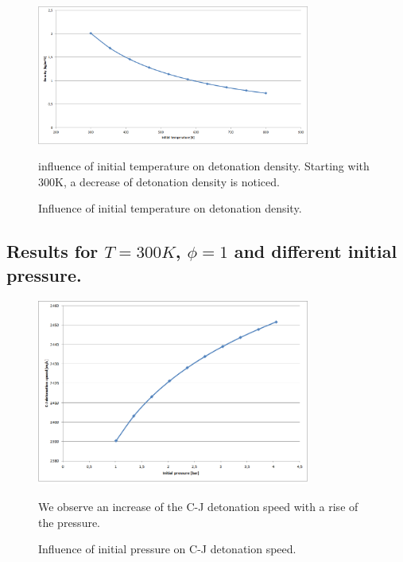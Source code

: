 \documentclass[11pt]{article}
\begin{document}
 \begin{figure} [H]
	\begin{center}
    	\includegraphics[width=0.8\textwidth]{ftemp_dens}
        \caption{Influence of initial temperature on detonation density.}
    \end{center}
\normalsize
{influence of initial temperature on detonation density. Starting with 300K, a decrease of detonation density is noticed. }
\end{figure}










\subsection{Results for $T=300K$, $\phi =1$ and different initial pressure.}


 \begin{figure} [H]
	\begin{center}
    	\includegraphics[width=0.8\textwidth]{fpress_speed}
        \caption{Influence of initial pressure on  C-J detonation speed.}
    \end{center}
\normalsize
{We observe an increase of the C-J detonation speed with a rise of the pressure.}
\end{figure}
\end{document}

